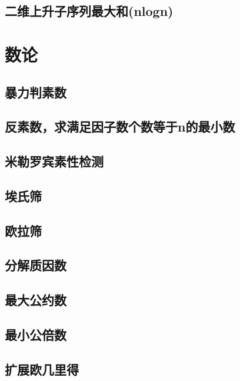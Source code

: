 \section{二维上升子序列最大和(nlogn)}
\raggedbottom
\hrulefill

\chapter{数论}
\section{暴力判素数}
\raggedbottom
\hrulefill
\section{反素数，求满足因子数个数等于n的最小数}
\raggedbottom
\hrulefill
\section{米勒罗宾素性检测}
\raggedbottom
\hrulefill
\section{埃氏筛}
\raggedbottom
\hrulefill
\section{欧拉筛}
\raggedbottom
\hrulefill
\section{分解质因数}
\raggedbottom
\hrulefill
\section{最大公约数}
\raggedbottom
\hrulefill
\section{最小公倍数}
\raggedbottom
\hrulefill
\section{扩展欧几里得}
\raggedbottom
\hrulefill
